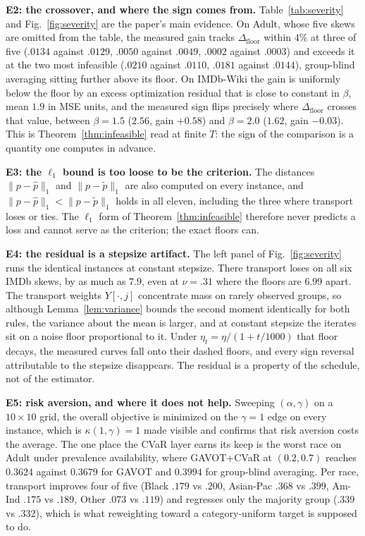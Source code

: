 \documentclass{article}
\theoremstyle{definition}
\newcommand{\avot}{\textsf{GAVOT}}
\newcommand{\avotcvar}{\textsf{GAVOT+CVaR}}
\begin{document}
\noindent\textbf{E2: the crossover, and where the sign comes from.}
Table~\ref{tab:severity} and Fig.~\ref{fig:severity} are the paper's main
evidence. On Adult, whose five skews are omitted from the table, the measured gain tracks
$\Delta_{\mathrm{floor}}$ within $4\%$ at three of five
($.0134$ against $.0129$, $.0050$ against $.0049$, $.0002$ against $.0003$)
and exceeds it at the two most infeasible ($.0210$ against $.0110$, $.0181$
against $.0144$), group-blind averaging sitting further above its floor. On IMDb-Wiki the gain is
uniformly below the floor by an excess optimization residual that is close to
constant in $\beta$, mean $1.9$ in MSE units, and the measured sign flips
precisely where $\Delta_{\mathrm{floor}}$ crosses that value, between
$\beta{=}1.5$ ($2.56$, gain $+0.58$) and $\beta{=}2.0$ ($1.62$, gain $-0.03$).
This is Theorem~\ref{thm:infeasible} read at finite $T$: the sign of the
comparison is a quantity one computes in advance.

\noindent\textbf{E3: the $\ell_1$ bound is too loose to be the criterion.}
The distances $\|p-\hat p\|_1$ and $\|p-\tilde p\|_1$ are also computed on every
instance, and $\|p-\hat p\|_1<\|p-\tilde p\|_1$ holds in all eleven, including
the three where transport loses or ties. The $\ell_1$ form of
Theorem~\ref{thm:infeasible} therefore never predicts a loss and cannot serve as
the criterion; the exact floors can.

\noindent\textbf{E4: the residual is a stepsize artifact.}
The left panel of Fig.~\ref{fig:severity} runs the identical instances at
constant stepsize. There transport loses on all six IMDb skews, by as much as
$7.9$, even at $\nu{=}.31$ where the floors are $6.99$ apart. The transport
weights $Y[\cdot,j]$ concentrate mass on rarely observed groups, so although
Lemma~\ref{lem:variance} bounds the second moment identically for both rules,
the variance about the mean is larger, and at constant stepsize the iterates sit
on a noise floor proportional to it. Under $\eta_t=\eta/(1+t/1000)$ that floor
decays, the measured curves fall onto their dashed floors, and every sign
reversal attributable to the stepsize disappears. The residual is a property of
the schedule, not of the estimator.

\noindent\textbf{E5: risk aversion, and where it does not help.}
Sweeping $(\alpha,\gamma)$ on a $10\times10$ grid, the overall objective is
minimized on the $\gamma=1$ edge on every instance, which is
$\kappa(1,\gamma)=1$ made visible and confirms that risk aversion costs the
average. The one place the CVaR layer earns its keep is the worst race on Adult
under prevalence availability, where \avotcvar{} at $(0.2,0.7)$ reaches
$0.3624$ against $0.3679$ for \avot{} and $0.3994$ for group-blind averaging.
Per race, transport improves four of five (Black $.179$ vs $.200$, Asian-Pac
$.368$ vs $.399$, Am-Ind $.175$ vs $.189$, Other $.073$ vs $.119$) and regresses
only the majority group ($.339$ vs $.332$), which is what reweighting toward a
category-uniform target is supposed to do.
\end{document}
